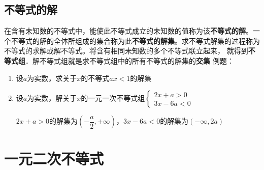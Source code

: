 \subsection*{不等式的解}
在含有未知数的不等式中，能使此不等式成立的未知数的值称为该\textbf{不等式的解}。一个不等式的解的全体所组成的集合称为此\textbf{不等式的解集}。求不等式解集的过程称为不等式的求解或解不等式。将含有相同未知数的多个不等式联立起来， 就得到\textbf{不等式组}．解不等式组就是求不等式组中的所有不等式的解集的\textbf{交集}
例题：
\begin{enumerate}
    \item 设$a$为实数，求关于$x$的不等式$ax < 1$的解集
    \begin{jieda}
    \end{jieda}
    \item 设$a$为实数，解关于$x$的一元一次不等式组$
    \left \{
        \begin{array}{l}
             2x+a > 0  \\
             3x - 6a < 0 
        \end{array}
    \right.
    $
    \begin{jieda}
        $2x+a > 0$的解集为$\left(-\dfrac{a}{2}, +\infty\right)$，$3x-6a<0$的解集为$(-\infty, 2a)$
    \end{jieda} 
\end{enumerate}
\section*{一元二次不等式}
